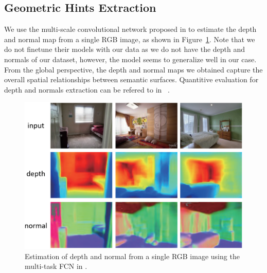 

\subsection{Geometric Hints Extraction}
\label{sec:depth_normal}

We use the multi-scale convolutional network proposed in \cite{eigen2015predicting} to estimate the depth and normal map from a single RGB image, as shown in Figure~\ref{fig:depthandnormal}. Note that we do not finetune their models with our data as we do not have the depth and normals of our dataset, however, the model seems to generalize well in our case. From the global perspective, the depth and normal maps we obtained capture the overall spatial relationships between semantic surfaces. Quantitive evaluation for depth and normals extraction can be refered to in ~\cite{eigen2015predicting}.
%

\begin{figure}
	\centering
	\includegraphics[width=\columnwidth]{figure/geometricinfo1.png}
	\caption{Estimation of depth and normal from a single RGB image using the multi-task FCN in \cite{eigen2015predicting}.}
	\label{fig:depthandnormal}
\end{figure}

